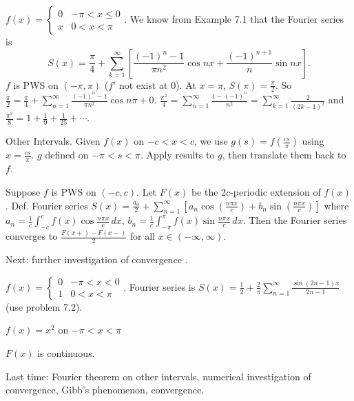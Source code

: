 \documentclass[]{article}
\begin{document}
\begin{example}
	$f(x) = \begin{cases} 0 & -\pi<x\leq 0 \\ x & 0<x<\pi \end{cases}$. We know from Example 7.1 that the Fourier series is $$S(x) = \frac{\pi}{4} + \sum_{k=1}^\infty \left[ \frac{(-1)^n-1}{\pi n^2}\cos{nx} + \frac{(-1)^{n+1}}{n}\sin{nx}\right].$$ $f$ is PWS on $(-\pi,\pi)$ ($f'$ not exist at 0). At $x=\pi$, $S(\pi) = \frac{\pi}{2}$. So $\frac{\pi}{2} = \frac{\pi}{4} + \sum_{n=1}^\infty \frac{(-1)^n-1}{\pi n^2} \cos{n\pi} + 0$. $\frac{\pi^2}{4} = \sum_{n=1}^\infty \frac{1-(-1)^n}{n^2} = \sum_{k=1}^\infty \frac{2}{(2k-1)^2}$ and $\frac{\pi^2}{8} = 1 + \frac{1}{9} + \frac{1}{25} + \cdots$.
\end{example}

Other Intervals.
Given $f(x)$ on $-c<x<c$, we use $g(s) = f\left(\frac{cs}{\pi}\right)$ using $x=\frac{cs}{\pi}$. $g$ defined on $-\pi<s<\pi$. Apply results to $g$, then translate them back to $f$.
\begin{theorem}
	Suppose $f$ is PWS on $(-c,c)$. Let $F(x)$ be the $2c$-periodic extension of $f(x)$. Def. Fourier series
	$S(x) = \frac{a_0}{2} + \sum_{n=1}^\infty \left[ a_n \cos{\left(\frac{n\pi x}{c}\right)} + b_n \sin{\left(\frac{n\pi x}{c} \right)} \right]$
	where $a_n = \frac{1}{c} \int_{-c}^c f(x) \cos{\frac{n\pi x}{c}} \, dx$, $b_n = \frac{1}{c} \int_{-\pi}^\pi f(x) \sin{\frac{n\pi x}{c}} \, dx$. Then the Fourier series converges to $\frac{F(x+)-F(x-)}{2}$ for all $x\in (-\infty,\infty)$.
\end{theorem}

Next: further investigation of convergence .
\begin{example}
	$f(x) = \begin{cases} 0 & -\pi<x<0 \\ 1 & 0<x<\pi \end{cases}$. Fourier series is $S(x) = \frac{1}{2} + \frac{2}{\pi} \sum_{n=1}^\infty \frac{\sin{(2n-1)x}}{2n-1}$ (use problem 7.2).
\end{example}
\begin{example}
	$f(x) = x^2 $ on $-\pi<x<\pi$
	\begin{note}
		$F(x)$ is continuous.
	\end{note}
\end{example}

Last time: Fourier theorem on other intervals, numerical investigation of convergence, Gibb's phenomenon,  convergence.
\end{document}
